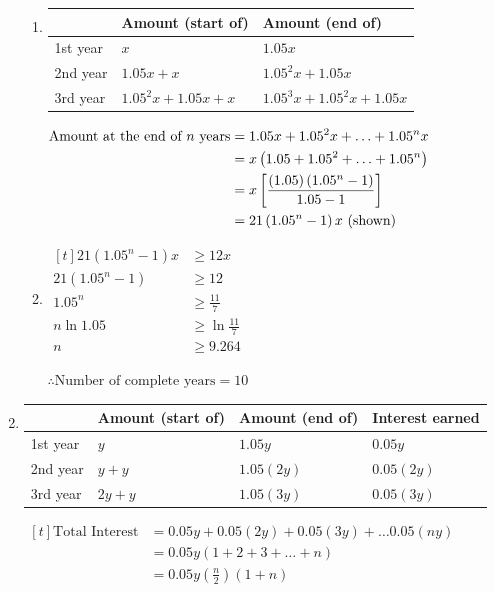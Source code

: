 \documentclass[11pt,a4paper]{book}
\begin{document}
\begin{example}
\begin{enumerate}[label=(\alph*)]
\begin{enumerate}[label=(\roman*)]
\item \setlength{\extrarowheight}{2pt}%
\begin{tabular}[t]{|>{\centering}p{3cm}|>{\centering}p{4.5cm}|>{\centering}p{4.5cm}|}
\hline 
 & Amount (start of) & Amount (end of)\tabularnewline
\hline 
1st year & $x$ & $1.05x$\tabularnewline
\hline 
2nd year & $1.05x+x$ & $1.05^{2}x+1.05x$\tabularnewline
\hline 
3rd year & $1.05^{2}x+1.05x+x$ & $1.05^{3}x+1.05^{2}x+1.05x$\tabularnewline
\hline 
\end{tabular}

$
\begin{aligned}[t]
\text{Amount at the end of \ensuremath{n} years} & =1.05x+1.05^{2}x+\ldots+1.05^{n}x\\
 & =x\left(1.05+1.05^{2}+\ldots+1.05^{n}\right)\\
 & =x\left[\frac{\left(1.05\right)\left(1.05^{n}-1\right)}{1.05-1}\right]\\
 & =21\left(1.05^{n}-1\right)x\text{ (shown)}
\end{aligned}
$

\item  
$
\begin{aligned}[t]
21\left(1.05^{n}-1\right)x & \geq12x\\
21\left(1.05^{n}-1\right) & \geq12\\
1.05^{n} & \geq\frac{11}{7}\\
n\ln1.05 & \geq\ln\frac{11}{7}\\
n & \geq9.264
\end{aligned}
$

$\therefore\text{Number of complete years}=10$
 

\end{enumerate}

\item 
\begin{minipage}[t]{0.5\textwidth} 
 \setlength{\extrarowheight}{2pt}%
\begin{tabular}[t]{|>{\centering}p{1.5cm}|>{\centering}p{1.4cm}|>{\centering}p{1.5cm}|>{\centering}p{1.5cm}|}
\hline 
 & Amount (start of) & Amount (end of) & Interest earned\tabularnewline
\hline 
1st year & $y$ & $1.05y$ & $0.05y$\tabularnewline
\hline 
2nd year & $y+y$ & $1.05\left(2y\right)$ & $0.05\left(2y\right)$\tabularnewline
\hline 
3rd year & $2y+y$ & $1.05\left(3y\right)$ & $0.05\left(3y\right)$\tabularnewline
\hline 
\end{tabular}
\end{minipage}
\begin{minipage}[t]{0.45\textwidth} 
\vspace{.5cm}
$
\begin{aligned}[t]
\text{Total Interest} & =0.05y+0.05\left(2y\right)+0.05\left(3y\right)+\ldots0.05\left(ny\right)\\
 & =0.05y\left(1+2+3+\ldots+n\right)\\
 & =0.05y\left(\frac{n}{2}\right)\left(1+n\right)
\end{aligned}
$
\end{minipage}


\end{enumerate}
\end{example}
\end{document}
